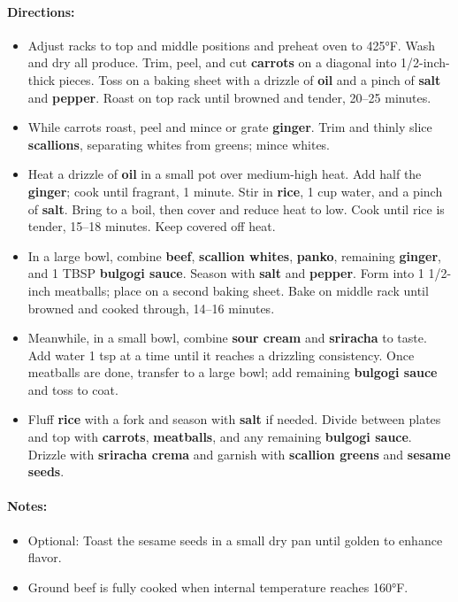 \documentclass{article}
\begin{document}
\paragraph{Directions:}
\begin{itemize}
    \item Adjust racks to top and middle positions and preheat oven to 425°F. Wash and dry all produce. Trim, peel, and cut \textbf{carrots} on a diagonal into 1/2-inch-thick pieces. Toss on a baking sheet with a drizzle of \textbf{oil} and a pinch of \textbf{salt} and \textbf{pepper}. Roast on top rack until browned and tender, 20–25 minutes.
    \item While carrots roast, peel and mince or grate \textbf{ginger}. Trim and thinly slice \textbf{scallions}, separating whites from greens; mince whites.
    \item Heat a drizzle of \textbf{oil} in a small pot over medium-high heat. Add half the \textbf{ginger}; cook until fragrant, 1 minute. Stir in \textbf{rice}, 1 cup water, and a pinch of \textbf{salt}. Bring to a boil, then cover and reduce heat to low. Cook until rice is tender, 15–18 minutes. Keep covered off heat.
    \item In a large bowl, combine \textbf{beef}, \textbf{scallion whites}, \textbf{panko}, remaining \textbf{ginger}, and 1 TBSP \textbf{bulgogi sauce}. Season with \textbf{salt} and \textbf{pepper}. Form into 1 1/2-inch meatballs; place on a second baking sheet. Bake on middle rack until browned and cooked through, 14–16 minutes.
    \item Meanwhile, in a small bowl, combine \textbf{sour cream} and \textbf{sriracha} to taste. Add water 1 tsp at a time until it reaches a drizzling consistency. Once meatballs are done, transfer to a large bowl; add remaining \textbf{bulgogi sauce} and toss to coat.
    \item Fluff \textbf{rice} with a fork and season with \textbf{salt} if needed. Divide between plates and top with \textbf{carrots}, \textbf{meatballs}, and any remaining \textbf{bulgogi sauce}. Drizzle with \textbf{sriracha crema} and garnish with \textbf{scallion greens} and \textbf{sesame seeds}.
\end{itemize}

\paragraph{Notes:}
\begin{itemize}
    \item Optional: Toast the sesame seeds in a small dry pan until golden to enhance flavor.
    \item Ground beef is fully cooked when internal temperature reaches 160°F.
\end{itemize}
\end{document}
